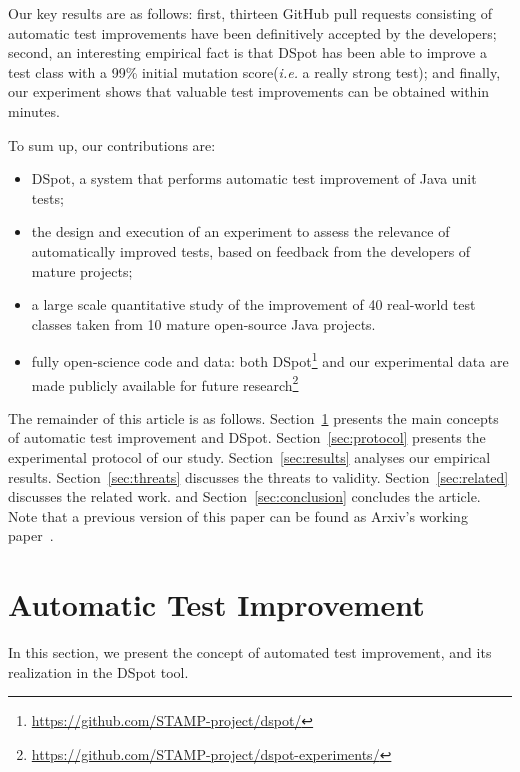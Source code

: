 \documentclass[table,xcdraw,smallextended]{svjour3}
\newcommand{\ie}{\textit{i.e.}\xspace}
\newcommand{\dspot}{DSpot\xspace}
\newcommand{\gh}{GitHub\xspace}
\newcommand{\ms}{mutation score\xspace}
\begin{document}
Our key results are as follows: first, thirteen \gh pull requests consisting of automatic test improvements have been definitively accepted by the developers; second, an interesting empirical fact is that \dspot has been able to improve a test class with a 99\% initial \ms (\ie a really strong test); and finally, our experiment shows that valuable test improvements can be obtained within minutes.

To sum up, our contributions are:
\begin{itemize}
\item  \dspot, a system that performs automatic test improvement of Java unit tests; 

\item the design and execution of an experiment to assess the relevance of automatically improved tests, based on feedback from the developers of mature projects;

\item a large scale quantitative study of the improvement of 40 real-world test classes taken from 10 mature open-source Java projects.

\item fully open-science code and data: both \dspot\footnote{\url{https://github.com/STAMP-project/dspot/}} and our experimental data are made publicly available for future research\footnote{\url{https://github.com/STAMP-project/dspot-experiments/}}

\end{itemize}

The remainder of this article is as follows.
Section~\ref{sec:dspot} presents the main concepts of automatic test improvement and \dspot.
Section~\ref{sec:protocol} presents the experimental protocol of our study.
Section~\ref{sec:results} analyses our empirical results. 
Section~\ref{sec:threats} discusses the threats to validity.
Section~\ref{sec:related} discusses the related work.
and Section~\ref{sec:conclusion} concludes the article.
Note that a previous version of this paper can be found as Arxiv's working paper~\cite{BaudryARM15}.

\section{Automatic Test Improvement}
\label{sec:dspot}

In this section, we present the concept of automated test improvement, and its realization in the \dspot tool.
\end{document}
